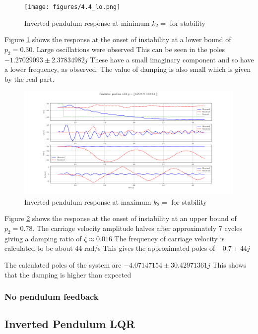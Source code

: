 \documentclass{article}
\begin{document}
\begin{figure}[H]
  \centering
  \texttt{[image: figures/4.4\_lo.png]}
  \caption{Inverted pendulum response at minimum $k_2 = $ for stability}
  \label{fig:roots4.4_lo}
\end{figure}

Figure \ref{fig:roots4.4_lo} shows the response at the onset of instability at a lower bound of $p_2 = 0.30$.
Large oscillations were observed 
This can be seen in the poles $-1.27029093 \pm 2.37834982j$
These have a small imaginary component and so have a lower frequency, as observed.
The value of damping is also small which is given by the real part.

\begin{figure}[H]
  \centering
  \includegraphics[width=0.99\textwidth]{figures/4.4_hi.png}
  \caption{Inverted pendulum response at maximum $k_2 = $ for stability}
  \label{fig:roots4.4_hi}
\end{figure}

Figure \ref{fig:roots4.4_hi} shows the response at the onset of instability at an upper bound of $p_2 = 0.78$.
The carriage velocity amplitude halves after approximately 7 cycles giving a damping ratio of $\zeta \approx 0.016$
The frequency of carriage velocity is calculated to be about 44 rad/s
This gives the approximated poles of $-0.7 \pm 44j$

The calculated poles of the system are $-4.07147154 \pm 30.42971361j$
This shows that the damping is higher than expected 

\subsubsection{No pendulum feedback}


\subsection{Inverted Pendulum LQR}
\end{document}
